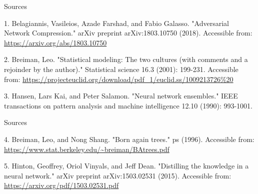 \documentclass{beamer}
\begin{document}
\begin{frame}{Sources}

\begin{thebibliography}{0}

   1. Belagiannis, Vasileios, Azade Farshad, and Fabio Galasso. "Adversarial Network Compression." arXiv preprint arXiv:1803.10750 (2018). Accessible from: \url{https://arxiv.org/abs/1803.10750}
  
   2. Breiman, Leo. "Statistical modeling: The two cultures (with comments and a rejoinder by the author)." Statistical science 16.3 (2001): 199-231. Accessible from: \url{https://projecteuclid.org/download/pdf_1/euclid.ss/1009213726\%20}
  
   3. Hansen, Lars Kai, and Peter Salamon. "Neural network ensembles." IEEE transactions on pattern analysis and machine intelligence 12.10 (1990): 993-1001.
\end{thebibliography}

\end{frame}


\begin{frame}{Sources}

\begin{thebibliography}{0}
   4. Breiman, Leo, and Nong Shang. "Born again trees." ps (1996). Accessible from: \url{https://www.stat.berkeley.edu/~breiman/BAtrees.pdf}
  
   5. Hinton, Geoffrey, Oriol Vinyals, and Jeff Dean. "Distilling the knowledge in a neural network." arXiv preprint arXiv:1503.02531 (2015). Accessible from: \url{https://arxiv.org/pdf/1503.02531.pdf}
  

\end{thebibliography}

\end{frame}
 
 
 
\end{document}
